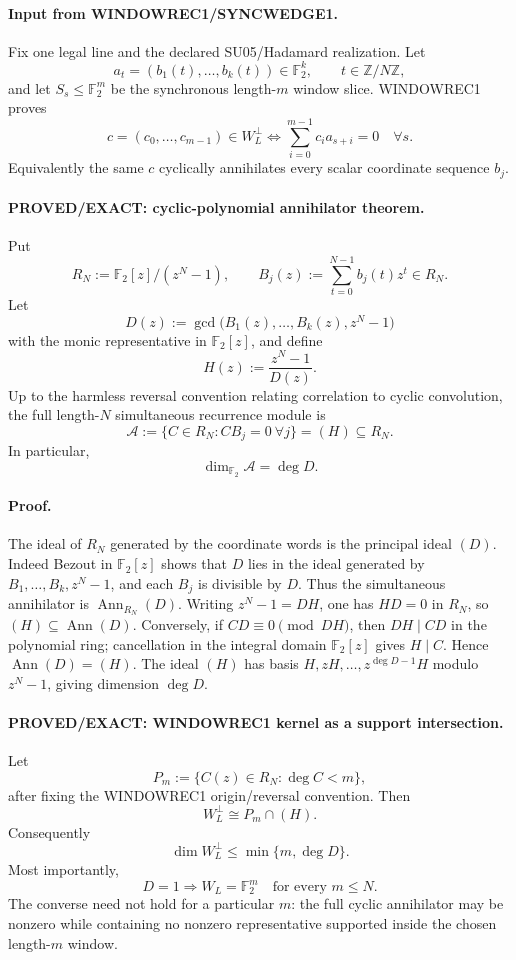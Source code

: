 \documentclass[11pt]{article}
\begin{document}
\paragraph{Input from WINDOWREC1/SYNCWEDGE1.}
Fix one legal line and the declared SU05/Hadamard realization. Let
\[
a_t=(b_1(t),\ldots,b_k(t))\in\mathbb F_2^k,\qquad t\in\mathbb Z/N\mathbb Z,
\]
and let \(S_s\le\mathbb F_2^m\) be the synchronous length-\(m\) window slice. WINDOWREC1 proves
\[
c=(c_0,\ldots,c_{m-1})\in W_L^\perp
\iff
\sum_{i=0}^{m-1}c_i a_{s+i}=0\quad\forall s.
\]
Equivalently the same \(c\) cyclically annihilates every scalar coordinate sequence \(b_j\).

\paragraph{PROVED/EXACT: cyclic-polynomial annihilator theorem.}
Put
\[
R_N:=\mathbb F_2[z]/(z^N-1),\qquad
B_j(z):=\sum_{t=0}^{N-1}b_j(t)z^t\in R_N.
\]
Let
\[
D(z):=\gcd\!\bigl(B_1(z),\ldots,B_k(z),z^N-1\bigr)
\]
with the monic representative in \(\mathbb F_2[z]\), and define
\[
H(z):=\frac{z^N-1}{D(z)}.
\]
Up to the harmless reversal convention relating correlation to cyclic convolution, the full length-\(N\) simultaneous recurrence module is
\[
\boxed{\mathcal A:=\{C\in R_N:C B_j=0\ \forall j\}=(H)\subseteq R_N.}
\]
In particular,
\[
\boxed{\dim_{\mathbb F_2}\mathcal A=\deg D.}
\]

\paragraph{Proof.}
The ideal of \(R_N\) generated by the coordinate words is the principal ideal \((D)\). Indeed Bezout in \(\mathbb F_2[z]\) shows that \(D\) lies in the ideal generated by \(B_1,\ldots,B_k,z^N-1\), and each \(B_j\) is divisible by \(D\). Thus the simultaneous annihilator is \(\operatorname{Ann}_{R_N}(D)\). Writing \(z^N-1=DH\), one has \(HD=0\) in \(R_N\), so \((H)\subseteq\operatorname{Ann}(D)\). Conversely, if \(CD\equiv0\pmod{DH}\), then \(DH\mid CD\) in the polynomial ring; cancellation in the integral domain \(\mathbb F_2[z]\) gives \(H\mid C\). Hence \(\operatorname{Ann}(D)=(H)\). The ideal \((H)\) has basis \(H,zH,\ldots,z^{\deg D-1}H\) modulo \(z^N-1\), giving dimension \(\deg D\).

\paragraph{PROVED/EXACT: WINDOWREC1 kernel as a support intersection.}
Let
\[
P_m:=\{C(z)\in R_N:\deg C<m\},
\]
after fixing the WINDOWREC1 origin/reversal convention. Then
\[
\boxed{W_L^\perp\cong P_m\cap(H).}
\]
Consequently
\[
\boxed{\dim W_L^\perp\le \min\{m,\deg D\}.}
\]
Most importantly,
\[
\boxed{D=1\Longrightarrow W_L=\mathbb F_2^m\quad\text{for every }m\le N.}
\]
The converse need not hold for a particular \(m\): the full cyclic annihilator may be nonzero while containing no nonzero representative supported inside the chosen length-\(m\) window.
\end{document}
